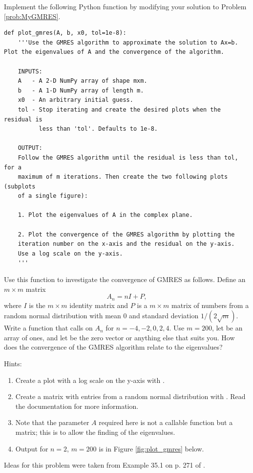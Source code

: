 \begin{problem}\label{prob:plot_gmres}
Implement the following Python function by modifying your solution to Problem \ref{prob:MyGMRES}.

\begin{lstlisting}
def plot_gmres(A, b, x0, tol=1e-8):
    '''Use the GMRES algorithm to approximate the solution to Ax=b. Plot the eigenvalues of A and the convergence of the algorithm.

    INPUTS:
    A   - A 2-D NumPy array of shape mxm.
    b   - A 1-D NumPy array of length m.
    x0  - An arbitrary initial guess.
    tol - Stop iterating and create the desired plots when the residual is
          less than 'tol'. Defaults to 1e-8.

    OUTPUT:
    Follow the GMRES algorithm until the residual is less than tol, for a
    maximum of m iterations. Then create the two following plots (subplots
    of a single figure):

    1. Plot the eigenvalues of A in the complex plane.

    2. Plot the convergence of the GMRES algorithm by plotting the
    iteration number on the x-axis and the residual on the y-axis.
    Use a log scale on the y-axis.
    '''
\end{lstlisting}

Use this function to investigate the convergence of GMRES as follows.
Define an $m\times m$ matrix
\[A_n = nI+P,\]
 where $I$ is the $m \times m$ identity matrix and $P$ is a $m \times m$ matrix of numbers from a random normal distribution with mean 0 and standard deviation $1/(2\sqrt{m})$.
 Write a function that calls  on $A_n$ for $n=-4,-2,0,2,4$. Use $m=200$, let  be an array of ones, and let  be the zero vector or anything else that suits you. How does the convergence of the GMRES algorithm relate to the eigenvalues?

 Hints:
 \begin{enumerate}
 \item Create a plot with a log scale on the y-axis with .
 \item Create a matrix with entries from a random normal distribution with .  Read the documentation for more information.
 \item Note that the parameter $A$ required here is not a callable function but a matrix; this is to allow the finding of the eigenvalues.
 \item Output for $n=2$, $m=200$ is in Figure \ref{fig:plot_gmres} below.
 \end{enumerate}
Ideas for this problem were taken from Example 35.1 on p. 271 of \cite{Trefethen1997}.
\end{problem}

